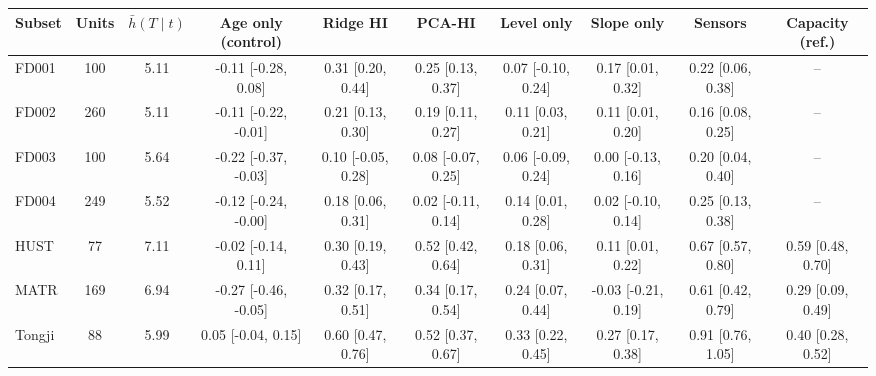 \begin{tabular}{l c c c c c c c c c }
\hline
Subset & Units & $\bar h(T\mid t)$ & Age only (control) & Ridge HI & PCA-HI & Level only & Slope only & Sensors & Capacity (ref.) \\
\hline
FD001 & 100 & 5.11 & -0.11 [-0.28, 0.08] & 0.31 [0.20, 0.44] & 0.25 [0.13, 0.37] & 0.07 [-0.10, 0.24] & 0.17 [0.01, 0.32] & 0.22 [0.06, 0.38] & -- \\
FD002 & 260 & 5.11 & -0.11 [-0.22, -0.01] & 0.21 [0.13, 0.30] & 0.19 [0.11, 0.27] & 0.11 [0.03, 0.21] & 0.11 [0.01, 0.20] & 0.16 [0.08, 0.25] & -- \\
FD003 & 100 & 5.64 & -0.22 [-0.37, -0.03] & 0.10 [-0.05, 0.28] & 0.08 [-0.07, 0.25] & 0.06 [-0.09, 0.24] & 0.00 [-0.13, 0.16] & 0.20 [0.04, 0.40] & -- \\
FD004 & 249 & 5.52 & -0.12 [-0.24, -0.00] & 0.18 [0.06, 0.31] & 0.02 [-0.11, 0.14] & 0.14 [0.01, 0.28] & 0.02 [-0.10, 0.14] & 0.25 [0.13, 0.38] & -- \\
\hline
HUST & 77 & 7.11 & -0.02 [-0.14, 0.11] & 0.30 [0.19, 0.43] & 0.52 [0.42, 0.64] & 0.18 [0.06, 0.31] & 0.11 [0.01, 0.22] & 0.67 [0.57, 0.80] & 0.59 [0.48, 0.70] \\
MATR & 169 & 6.94 & -0.27 [-0.46, -0.05] & 0.32 [0.17, 0.51] & 0.34 [0.17, 0.54] & 0.24 [0.07, 0.44] & -0.03 [-0.21, 0.19] & 0.61 [0.42, 0.79] & 0.29 [0.09, 0.49] \\
Tongji & 88 & 5.99 & 0.05 [-0.04, 0.15] & 0.60 [0.47, 0.76] & 0.52 [0.37, 0.67] & 0.33 [0.22, 0.45] & 0.27 [0.17, 0.38] & 0.91 [0.76, 1.05] & 0.40 [0.28, 0.52] \\
\hline
\end{tabular}
